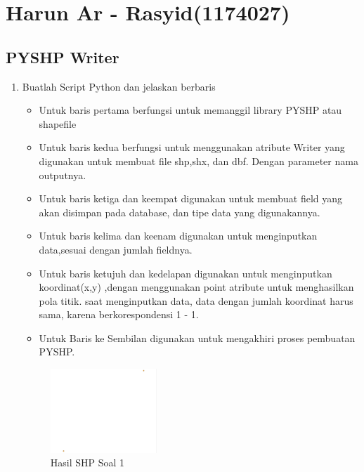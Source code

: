 \section{Harun Ar - Rasyid(1174027)}
\subsection{PYSHP Writer}
\begin{enumerate}
	\item Buatlah Script Python dan jelaskan berbaris
	
	\begin{itemize}
		\item Untuk baris pertama berfungsi untuk memanggil library PYSHP atau shapefile
		\item Untuk baris kedua berfungsi untuk menggunakan atribute Writer yang digunakan untuk membuat file shp,shx, dan dbf. Dengan parameter nama outputnya.
		\item Untuk baris ketiga dan keempat digunakan untuk membuat field yang akan disimpan pada database, dan tipe data yang digunakannya.
		\item Untuk baris kelima dan keenam digunakan untuk menginputkan data,sesuai dengan jumlah fieldnya.
		\item Untuk baris ketujuh dan kedelapan digunakan untuk menginputkan koordinat(x,y) ,dengan menggunakan point atribute untuk menghasilkan pola titik. \hfill\break
		saat menginputkan data, data dengan jumlah koordinat harus sama, karena berkorespondensi 1 - 1.
		\item Untuk Baris ke Sembilan digunakan untuk mengakhiri proses pembuatan PYSHP.
	\end{itemize}
	\hfill\break
	\begin{figure}[H]
		\includegraphics[width=4cm]{figures/1174027/2/soal1.png}
		\centering
		\caption{Hasil SHP Soal 1}
	\end{figure}


\end{enumerate}
